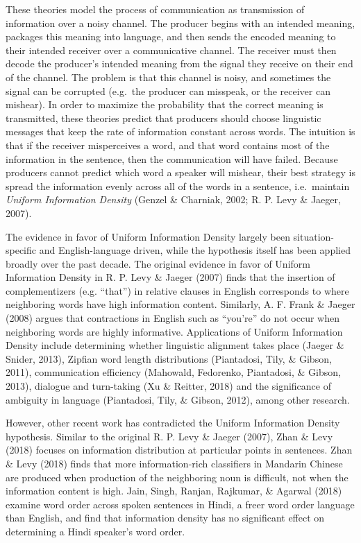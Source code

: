 \documentclass[10pt, letterpaper]{article}
\begin{document}
These theories model the process of communication as transmission of
information over a noisy channel. The producer begins with an intended
meaning, packages this meaning into language, and then sends the encoded
meaning to their intended receiver over a communicative channel. The
receiver must then decode the producer's intended meaning from the
signal they receive on their end of the channel. The problem is that
this channel is noisy, and sometimes the signal can be corrupted
(e.g.~the producer can misspeak, or the receiver can mishear). In order
to maximize the probability that the correct meaning is transmitted,
these theories predict that producers should choose linguistic messages
that keep the rate of information constant across words. The intuition
is that if the receiver misperceives a word, and that word contains most
of the information in the sentence, then the communication will have
failed. Because producers cannot predict which word a speaker will
mishear, their best strategy is spread the information evenly across all
of the words in a sentence, i.e.~maintain \emph{Uniform Information
Density} (Genzel \& Charniak, 2002; R. P. Levy \& Jaeger, 2007).

The evidence in favor of Uniform Information Density largely been
situation-specific and English-language driven, while the hypothesis
itself has been applied broadly over the past decade. The original
evidence in favor of Uniform Information Density in R. P. Levy \& Jaeger
(2007) finds that the insertion of complementizers (e.g. ``that'') in
relative clauses in English corresponds to where neighboring words have
high information content. Similarly, A. F. Frank \& Jaeger (2008) argues
that contractions in English such as ``you're'' do not occur when
neighboring words are highly informative. Applications of Uniform
Information Density include determining whether linguistic alignment
takes place (Jaeger \& Snider, 2013), Zipfian word length distributions
(Piantadosi, Tily, \& Gibson, 2011), communication efficiency (Mahowald,
Fedorenko, Piantadosi, \& Gibson, 2013), dialogue and turn-taking (Xu \&
Reitter, 2018) and the significance of ambiguity in language
(Piantadosi, Tily, \& Gibson, 2012), among other research.

However, other recent work has contradicted the Uniform Information
Density hypothesis. Similar to the original R. P. Levy \& Jaeger (2007),
Zhan \& Levy (2018) focuses on information distribution at particular
points in sentences. Zhan \& Levy (2018) finds that more
information-rich classifiers in Mandarin Chinese are produced when
production of the neighboring noun is difficult, not when the
information content is high. Jain, Singh, Ranjan, Rajkumar, \& Agarwal
(2018) examine word order across spoken sentences in Hindi, a freer word
order language than English, and find that information density has no
significant effect on determining a Hindi speaker's word order.
\end{document}
